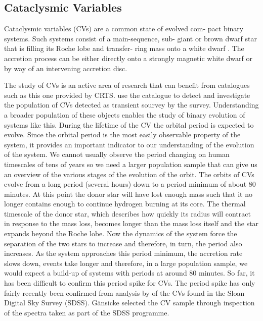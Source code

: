 \documentclass[a4paper,fleqn,usenatbib]{mnras}
\begin{document}
\subsection{Cataclysmic Variables}
Cataclysmic variables (CVs) are a common state of evolved com- pact binary systems. Such systems consist of a main-sequence, sub- giant or brown dwarf star that is filling its Roche lobe and transfer- ring mass onto a white dwarf \citep{WarnerBook}. The accretion process can be either directly onto a strongly magnetic white dwarf or by way of an intervening accretion disc. 

The study of CVs is an active area of research that can benefit from catalogues such as this one provided by CRTS. \citet{Breedt2014} use the catalogue to detect and investigate the population of CVs detected as transient sourvey by the survey. Understanding a broader population of these objects enables the study of binary evolution of systems like this.  During the lifetime of the CV the orbital period is expected to evolve. Since the orbital period is the most easily observable property of the system, it provides an important indicator to our understanding of the evolution of the system. We cannot usually observe the period changing on human timescales of tens of years so we need a larger population sample that can give us an overview of the various stages of the evolution of the orbit. The orbits of CVs evolve from a long period (several hours) down to a period minimum of about 80 minutes. At this point the donor star will have lost enough mass such that it no longer contains enough to continue hydrogen burning at its core. The thermal timescale of the donor star, which describes how quickly its radius will contract in response to the mass loss, becomes longer than the mass loss itself and the star expands beyond the Roche lobe. Now the dynamics of the system force the separation of the two stars to increase and therefore, in turn, the period also increases. As the system approaches this period minimum, the accretion rate slows down, events take longer and therefore, in a large population sample, we would expect a build-up of systems with periods at around 80 minutes. So far, it has been difficult to confirm this period spike for CVs.  The period spike has only fairly recently been confirmed from analysis by \citet{Gaensicke2009} of the CVs found in the Sloan Digital Sky Survey (SDSS).  G{\"a}nsicke selected the CV sample through inspection of the spectra taken as part of the SDSS programme. 
\end{document}
